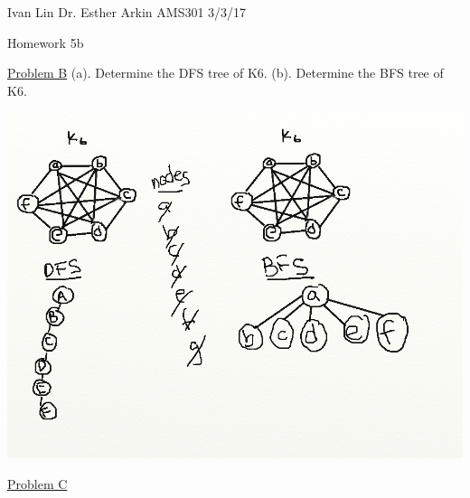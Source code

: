 \documentclass{article}
\begin{document}
Ivan Lin\newline{}
Dr. Esther Arkin\newline{}
AMS301\newline{}
3/3/17

\begin{center}
  Homework 5b
\end{center}

\underline{Problem B}
(a). Determine the DFS tree of K6.
(b). Determine the BFS tree of K6.

\includegraphics[width=\textwidth]{problemb.png}

\underline{Problem C} 
\end{document}
